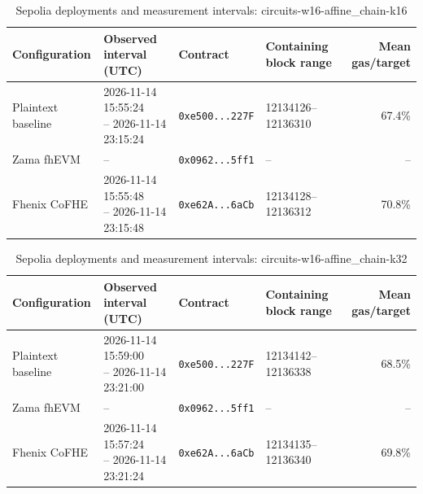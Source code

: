 \begin{table}[!t]
\caption{Sepolia deployments and measurement intervals: circuits-w16-affine\_chain-k16}
\label{tab:sepolia-circuits-w16-affine-chain-k16}
\centering
\footnotesize
\setlength{\tabcolsep}{4pt}
\begin{tabular}{|l|l|l|l|r|}
\hline
\textbf{Configuration} & \textbf{Observed interval (UTC)} & \textbf{Contract} & \textbf{Containing block range} & \textbf{Mean gas/target} \\
\hline
Plaintext baseline & \shortstack[l]{2026-11-14 15:55:24 \\ -- 2026-11-14 23:15:24} & \texttt{0xe500...227F} & 12134126--12136310 & 67.4\% \\
\hline
Zama fhEVM & -- & \texttt{0x0962...5ff1} & -- & -- \\
\hline
Fhenix CoFHE & \shortstack[l]{2026-11-14 15:55:48 \\ -- 2026-11-14 23:15:48} & \texttt{0xe62A...6aCb} & 12134128--12136312 & 70.8\% \\
\hline
\end{tabular}
\end{table}

\begin{table}[!t]
\caption{Sepolia deployments and measurement intervals: circuits-w16-affine\_chain-k32}
\label{tab:sepolia-circuits-w16-affine-chain-k32}
\centering
\footnotesize
\setlength{\tabcolsep}{4pt}
\begin{tabular}{|l|l|l|l|r|}
\hline
\textbf{Configuration} & \textbf{Observed interval (UTC)} & \textbf{Contract} & \textbf{Containing block range} & \textbf{Mean gas/target} \\
\hline
Plaintext baseline & \shortstack[l]{2026-11-14 15:59:00 \\ -- 2026-11-14 23:21:00} & \texttt{0xe500...227F} & 12134142--12136338 & 68.5\% \\
\hline
Zama fhEVM & -- & \texttt{0x0962...5ff1} & -- & -- \\
\hline
Fhenix CoFHE & \shortstack[l]{2026-11-14 15:57:24 \\ -- 2026-11-14 23:21:24} & \texttt{0xe62A...6aCb} & 12134135--12136340 & 69.8\% \\
\hline
\end{tabular}
\end{table}
